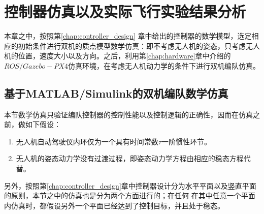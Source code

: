 \chapter{控制器仿真以及实际飞行实验结果分析}
\label{chap:simulatin_expermient}
本章之中，按照第\ref{chap:controller_design}
章中给出的控制器的数学模型，选定相应的初始条件进行双机的质点模型数学仿真：即不考虑无人机的姿态，只考虑无人机的位置，速度大小以及方向。之后，利用第\ref{chap:hardware}章中介绍的$ROS/Gazebo-PX4$仿真环境，在考虑无人机动力学的条件下进行双机编队仿真。
\section{基于MATLAB/Simulink的双机编队数学仿真}
本节数学仿真只验证编队控制器的控制性能以及控制逻辑的正确性，因而在仿真之前，做如下假设：
\begin{enumerate}
\item 无人机自动驾驶仪内环仅为一个具有时间常数$\tau$一阶惯性环节。
\item 无人机的姿态动力学没有过渡过程，即姿态动力学方程由相应的稳态方程代替。
\end{enumerate}
另外，按照第\ref{chap:controller_design}章中控制器设计分为水平平面以及竖直平面的原则，本节之中的仿真也是分为两个方面进行的；在任何
在其中任意一个平面内仿真时，都假设另外一个平面已经达到了控制目标，并且处于稳态。

